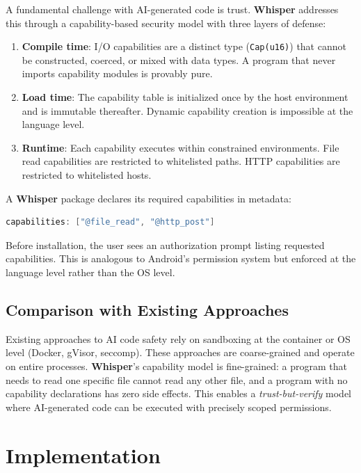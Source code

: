 \documentclass[11pt,a4paper]{article}
\begin{document}
A fundamental challenge with AI-generated code is trust. \textbf{Whisper}
addresses this through a capability-based security model with three layers of
defense:

\begin{enumerate}
\item \textbf{Compile time}: I/O capabilities are a distinct type
  (\texttt{Cap(u16)}) that cannot be constructed, coerced, or mixed with data
  types. A program that never imports capability modules is provably pure.
\item \textbf{Load time}: The capability table is initialized once by the host
  environment and is immutable thereafter. Dynamic capability creation is
  impossible at the language level.
\item \textbf{Runtime}: Each capability executes within constrained
  environments. File read capabilities are restricted to whitelisted paths.
  HTTP capabilities are restricted to whitelisted hosts.
\end{enumerate}

A \textbf{Whisper} package declares its required capabilities in metadata:

\begin{lstlisting}[language=C,basicstyle=\ttfamily\small]
capabilities: ["@file_read", "@http_post"]
\end{lstlisting}

Before installation, the user sees an authorization prompt listing requested
capabilities. This is analogous to Android's permission system but enforced at
the language level rather than the OS level.

\subsection{Comparison with Existing Approaches}

Existing approaches to AI code safety rely on sandboxing at the container or
OS level (Docker, gVisor, seccomp). These approaches are coarse-grained and
operate on entire processes. \textbf{Whisper}'s capability model is
fine-grained: a program that needs to read one specific file cannot read any
other file, and a program with no capability declarations has zero side
effects. This enables a \textit{trust-but-verify} model where AI-generated
code can be executed with precisely scoped permissions.

\section{Implementation}
\label{sec:implementation}
\end{document}
